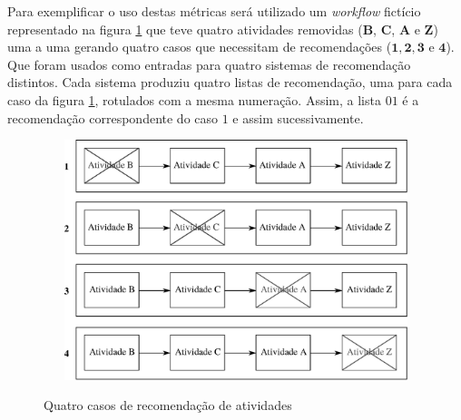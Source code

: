 Para exemplificar o uso destas métricas será utilizado um \emph{workflow} fictício representado na figura \ref{figura_atividades_removidas} que teve quatro atividades removidas (\textbf{B}, \textbf{C}, \textbf{A} e \textbf{Z}) uma a uma gerando quatro casos que necessitam de recomendações (\(\mathbf{1}, \mathbf{2}, \mathbf{3}\) e \(\mathbf{4}\)). Que foram usados como entradas para quatro sistemas de recomendação distintos. Cada sistema produziu quatro listas de recomendação, uma para cada caso da figura \ref{figura_atividades_removidas}, rotulados com a mesma numeração. Assim, a lista \(01\) é a recomendação correspondente do caso \(1\) e assim sucessivamente.
\begin{figure}[!hbt]
	\centering   
	\caption{Quatro casos de recomendação de atividades}
	\includegraphics[width=13cm, height=7cm]{./secoes/conceitosFundamentais/pics/img/atividadeRemovida.eps}
	\vspace{0.1cm}
	\source{\varAutorData}
	\label{figura_atividades_removidas}
\end{figure}

